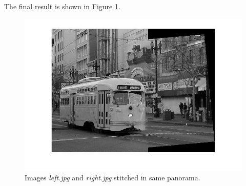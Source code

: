 \documentclass[11pt]{article}
\begin{document}
The final result is shown in Figure \ref{fig:stitched}.

\begin{figure}[htpb]
	\centering
	\includegraphics[width=1\textwidth]{imgs/stitched.jpg}
	\caption{Images \textit{left.jpg} and \textit{right.jpg} stitched in same
	panorama.}
	\label{fig:stitched}
\end{figure}
\end{document}
